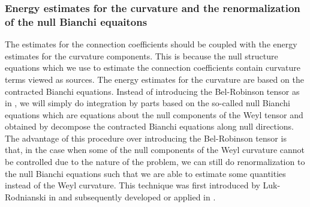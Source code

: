 \documentclass[11pt,reqno]{amsart}
\theoremstyle{definition}
\numberwithin{equation}{section}
\begin{document}
\subsubsection{Energy estimates for the curvature and the renormalization of the null Bianchi equaitons}
The estimates for the connection coefficients should be coupled with the energy estimates for the curvature components. This is because the null structure equations which we use to estimate the connection coefficients contain curvature terms viewed as sources. The energy estimates for the curvature are based on the contracted Bianchi equations. Instead of introducing the Bel-Robinson tensor as in \cite{Chr, Ch-K}, we will simply do integration by parts based on the so-called null Bianchi equations which are equations about the null components of the Weyl tensor and obtained by decompose the contracted Bianchi equations along null directions. The advantage of this procedure over introducing the Bel-Robinson tensor is that, in the case when some of the null components of the Weyl curvature cannot be controlled due to the nature of the problem, we can  still do renormalization to the null Bianchi equations such that we are able to estimate some quantities instead of the Weyl curvature. This technique was first introduced by Luk-Rodnianski in \cite{L-R1} and subsequently developed or applied in \cite{An-Luk, L-Z1, L-R2, Luk}. 
\end{document}

